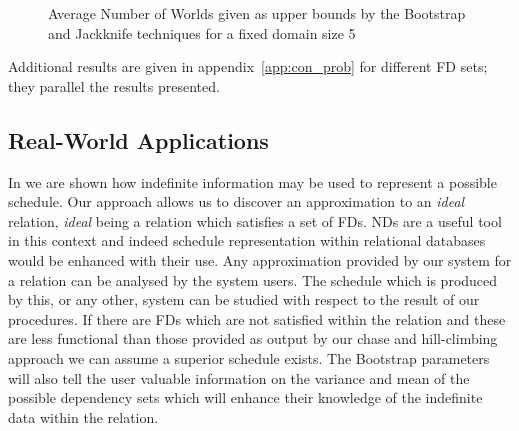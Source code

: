 \begin{figure}
\centerline{}
\caption{\label{graph:bj1} {Average Number of Worlds given as 
upper bounds by the Bootstrap and Jackknife techniques for a fixed domain
size 5}}
\end{figure}

Additional results are given in appendix~\ref{app:con_prob} for
different FD sets; they parallel the results presented.

\subsection{Real-World Applications}\label{sec:cp_apps}

In \cite{inv91} we are shown how indefinite information may be used to
represent a possible schedule. Our approach allows us to discover an
approximation to an {\em ideal} relation, {\em ideal} being a relation
which satisfies
a set of FDs. NDs are a useful tool in this context and indeed 
schedule representation within relational databases would be enhanced with
their use. Any approximation
provided by our system for a relation can be analysed by the system
users. The schedule which is produced by this, or any other, system can
be studied with respect to the result of our procedures. If there are
FDs which are not satisfied within the relation and these are less
functional than those provided as output by our chase and hill-climbing
approach we can assume a superior schedule exists. The Bootstrap
parameters will also tell the user valuable information on the
variance and mean of the possible dependency sets which will enhance
their knowledge of the indefinite data within the relation.

